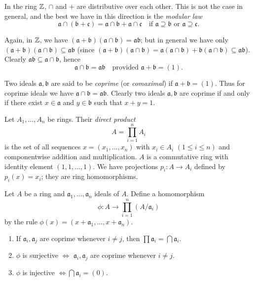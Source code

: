 In the ring $\mathbb{Z}$, $\cap$ and $+$ are distributive over each other. This is not the case in general, and the best we have in this direction is the \emph{modular law}
\[
    \mathfrak{a} \cap (\mathfrak{b} + \mathfrak{c}) = \mathfrak{a} \cap \mathfrak{b} + \mathfrak{a} \cap \mathfrak{c} \quad \text{if } \mathfrak{a} \supseteq \mathfrak{b} \text{ or } \mathfrak{a} \supseteq \mathfrak{c}.
\]

Again, in $\mathbb{Z}$, we have $(\mathfrak{a} + \mathfrak{b})(\mathfrak{a} \cap \mathfrak{b}) = \mathfrak{a}\mathfrak{b}$; but in general we have only $(\mathfrak{a} + \mathfrak{b})(\mathfrak{a} \cap \mathfrak{b}) \subseteq \mathfrak{a}\mathfrak{b}$ (since $(\mathfrak{a} + \mathfrak{b})(\mathfrak{a} \cap \mathfrak{b}) = \mathfrak{a}(\mathfrak{a} \cap \mathfrak{b}) + \mathfrak{b}(\mathfrak{a} \cap \mathfrak{b}) \subseteq \mathfrak{a}\mathfrak{b}$). Clearly $\mathfrak{a}\mathfrak{b} \subseteq \mathfrak{a} \cap \mathfrak{b}$, hence
\[
    \mathfrak{a} \cap \mathfrak{b} = \mathfrak{a}\mathfrak{b} \quad \text{provided } \mathfrak{a} + \mathfrak{b} = (1).
\]

Two ideals $\mathfrak{a}, \mathfrak{b}$ are said to be \emph{coprime} (or \emph{comaximal}) if $\mathfrak{a} + \mathfrak{b} = (1)$. Thus for coprime ideals we have $\mathfrak{a} \cap \mathfrak{b} = \mathfrak{a}\mathfrak{b}$. Clearly two ideals $\mathfrak{a}, \mathfrak{b}$ are coprime if and only if there exist $x \in \mathfrak{a}$ and $y \in \mathfrak{b}$ such that $x + y = 1$.

Let $A_1, \ldots, A_n$ be rings. Their \emph{direct product}
\[
A = \prod_{i=1}^{n} A_i
\]
is the set of all sequences $x = (x_1, \ldots, x_n)$ with $x_i \in A_i$ $(1 \le i \le n)$ and componentwise addition and multiplication. $A$ is a commutative ring with identity element $(1, 1, \ldots, 1)$. We have projections $p_i \colon A \to A_i$ defined by $p_i(x) = x_i$; they are ring homomorphisms.

Let $A$ be a ring and $\mathfrak{a}_1, \ldots, \mathfrak{a}_n$ ideals of $A$. Define a homomorphism
\[
\phi \colon A \to \prod_{i=1}^{n} (A/\mathfrak{a}_i)
\]
by the rule $\phi(x) = (x + \mathfrak{a}_1, \ldots, x + \mathfrak{a}_n)$.

\begin{proposition}\label{pro:chinese-remainder}
\begin{enumerate}
    \item[i)] If $\mathfrak{a}_i, \mathfrak{a}_j$ are coprime whenever $i \neq j$, then $\prod \mathfrak{a}_i = \bigcap \mathfrak{a}_i$.
    \item[ii)] $\phi$ is surjective $\iff$ $\mathfrak{a}_i, \mathfrak{a}_j$ are coprime whenever $i \neq j$.
    \item[iii)] $\phi$ is injective $\iff \bigcap \mathfrak{a}_i = (0)$.
\end{enumerate}
\end{proposition}

